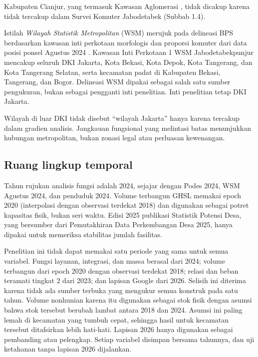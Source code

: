 \documentclass[12pt,a4paper,oneside,openany,indonesian]{report}
\begin{document}
Kabupaten Cianjur, yang termasuk Kawasan Aglomerasi \parencite{uu22024}, tidak dicakup karena tidak tercakup dalam Survei Komuter Jabodetabek (Subbab 1.4).

Istilah \emph{Wilayah Statistik Metropolitan} (WSM) merujuk pada
delineasi BPS berdasarkan kawasan inti perkotaan morfologis dan
proporsi komuter dari data posisi ponsel Agustus 2024
\parencite{bpswsm2024}. Kawasan Inti Perkotaan 1 WSM Jabodetabekpunjur
mencakup seluruh DKI Jakarta, Kota Bekasi, Kota Depok, Kota Tangerang,
dan Kota Tangerang Selatan, serta kecamatan padat di Kabupaten Bekasi,
Tangerang, dan Bogor. Delineasi WSM dipakai sebagai salah satu sumber
pengukuran, bukan sebagai pengganti inti penelitian. Inti penelitian
tetap DKI Jakarta.

Wilayah di luar DKI tidak disebut ``wilayah Jakarta'' hanya karena
tercakup dalam gradien analisis. Jangkauan fungsional yang melintasi
batas menunjukkan hubungan metropolitan, bukan zonasi legal atau
perluasan kewenangan.

\subsection{Ruang lingkup temporal}\label{ruang-lingkup-temporal}

Tahun rujukan analisis fungsi adalah 2024, sejajar dengan Podes 2024,
WSM Agustus 2024, dan penduduk 2024. Volume terbangun GHSL memakai epoch
2020 (interpolasi dengan observasi terdekat 2018) dan digunakan sebagai
potret kapasitas fisik, bukan seri waktu. Edisi 2025 publikasi
Statistik Potensi Desa, yang bersumber dari Pemutakhiran Data
Perkembangan Desa 2025, hanya dipakai untuk memeriksa stabilitas jumlah
fasilitas.

Penelitian ini tidak dapat memakai satu periode yang sama untuk semua
variabel. Fungsi layanan, integrasi, dan massa berasal dari 2024; volume
terbangun dari epoch 2020 dengan observasi terdekat 2018; relasi dan
beban teramati tingkat 2 dari 2023; dan lapisan Google dari 2026.
Selisih ini diterima karena tidak ada sumber terbuka yang mengukur
semua konstruk pada satu tahun. Volume nonhunian karena itu digunakan
sebagai stok fisik dengan asumsi bahwa stok tersebut berubah lambat
antara 2018 dan 2024. Asumsi ini paling lemah di kecamatan yang tumbuh
cepat, sehingga hasil untuk kecamatan tersebut ditafsirkan lebih
hati-hati. Lapisan 2026 hanya digunakan sebagai pembanding atau
pelengkap. Setiap variabel
disimpan bersama tahunnya, dan uji ketahanan tanpa lapisan 2026
dijalankan.
\end{document}
